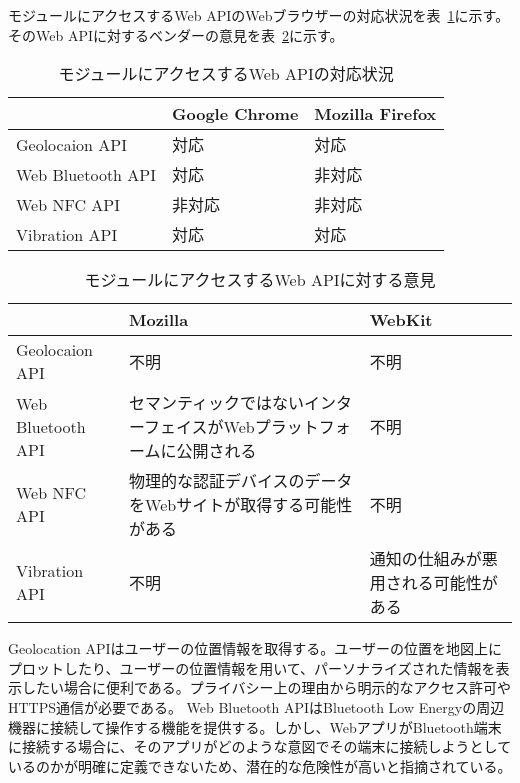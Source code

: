 モジュールにアクセスするWeb APIのWebブラウザーの対応状況を表~\ref{table:モジュールにアクセスするWeb APIの対応状況}に示す。そのWeb APIに対するベンダーの意見を表~\ref{table:モジュールにアクセスするWeb APIに対する意見}に示す。
\begin{table}
  \caption{モジュールにアクセスするWeb APIの対応状況}
  \label{table:モジュールにアクセスするWeb APIの対応状況}
  \centering
  \begin{tabular}{|p{13em}|p{8em}|p{8em}|}
    \hline
    & Google Chrome & Mozilla Firefox \\ \hline
    Geolocaion API & \cellcolor{gray!10}対応 & \cellcolor{gray!10}対応 \\ \hline
    Web Bluetooth API & \cellcolor{gray!10}対応 & \cellcolor{gray!30}非対応 \\ \hline
    Web NFC API & \cellcolor{gray!30}非対応 & \cellcolor{gray!30}非対応 \\ \hline
    Vibration API & \cellcolor{gray!10}対応 & \cellcolor{gray!10}対応 \\ \hline
  \end{tabular}
\end{table}
\begin{table}
    \centering
    \caption{モジュールにアクセスするWeb APIに対する意見}
    \label{table:モジュールにアクセスするWeb APIに対する意見}
    \begin{tabular}{|p{13em}|p{13em}|p{13em}|}
         \hline
         & Mozilla & WebKit \\ \hline
         Geolocaion API & 不明 & 不明 \\ \hline
         Web Bluetooth API & \cellcolor{gray!30}セマンティックではないインターフェイスがWebプラットフォームに公開される~\cite{MozillaWebBluetoothAPI} & 不明 \\ \hline
         Web NFC API & \cellcolor{gray!30}物理的な認証デバイスのデータをWebサイトが取得する可能性がある~\cite{MozillaWebNFCAPI} & 不明 \\ \hline
         Vibration API & 不明 & \cellcolor{gray!30}通知の仕組みが悪用される可能性がある \\ \hline
    \end{tabular}
\end{table}
Geolocation APIはユーザーの位置情報を取得する。ユーザーの位置を地図上にプロットしたり、ユーザーの位置情報を用いて、パーソナライズされた情報を表示したい場合に便利である。プライバシー上の理由から明示的なアクセス許可やHTTPS通信が必要である。
Web Bluetooth APIはBluetooth Low Energyの周辺機器に接続して操作する機能を提供する。しかし、WebアプリがBluetooth端末に接続する場合に、そのアプリがどのような意図でその端末に接続しようとしているのかが明確に定義できないため、潜在的な危険性が高いと指摘されている。

